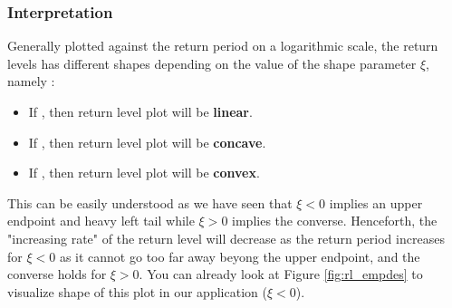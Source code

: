 \subsubsection*{Interpretation}

Generally plotted against the return period on a logarithmic scale, the return levels has different shapes depending on the value of the shape parameter $\xi$, namely :

\begin{itemize}
	\item If , then return level plot will be \textbf{linear}.
     \item If , then return level plot will be \textbf{concave}.
     \item If , then return level plot will be \textbf{convex}.
\end{itemize}

This can be easily understood as we have seen that $\xi<0$ implies an upper endpoint and heavy left tail while $\xi>0$ implies the converse. Henceforth, the "increasing rate" of the return level will decrease as the return period increases for $\xi<0$ as it cannot go too far away beyong the upper endpoint, and the converse holds for $\xi>0$.
You can already look at Figure \ref{fig:rl_empdes} to visualize shape of this plot in our application ($\xi<0$).

\iffalse

